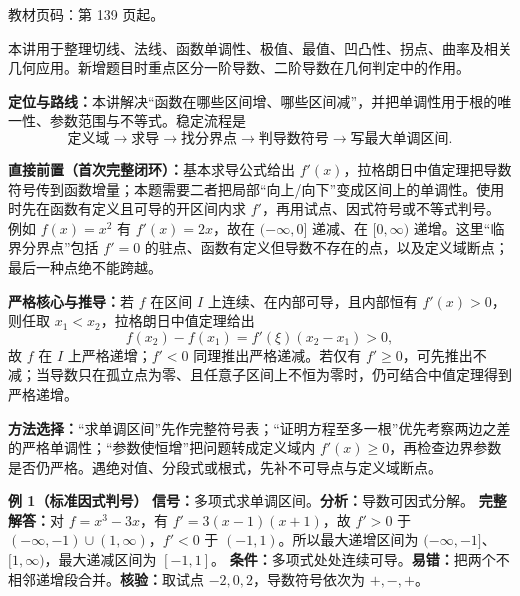
\begin{knowledgeBox}
教材页码：第 139 页起。

本讲用于整理切线、法线、函数单调性、极值、最值、凹凸性、拐点、曲率及相关几何应用。新增题目时重点区分一阶导数、二阶导数在几何判定中的作用。
\end{knowledgeBox}


\par

\begin{knowledgeBox}
\textbf{定位与路线：}本讲解决“函数在哪些区间增、哪些区间减”，并把单调性用于根的唯一性、参数范围与不等式。稳定流程是
\[
\boxed{\text{定义域}\to\text{求导}\to\text{找分界点}\to\text{判导数符号}\to\text{写最大单调区间}}.
\]

\textbf{直接前置（首次完整闭环）：}基本求导公式给出 \(f'(x)\)，拉格朗日中值定理把导数符号传到函数增量；本题需要二者把局部“向上/向下”变成区间上的单调性。使用时先在函数有定义且可导的开区间内求 \(f'\)，再用试点、因式符号或不等式判号。例如 \(f(x)=x^2\) 有 \(f'(x)=2x\)，故在 \((-\infty,0]\) 递减、在 \([0,\infty)\) 递增。这里“临界分界点”包括 \(f'=0\) 的驻点、函数有定义但导数不存在的点，以及定义域断点；最后一种点绝不能跨越。

\textbf{严格核心与推导：}若 \(f\) 在区间 \(I\) 上连续、在内部可导，且内部恒有 \(f'(x)>0\)，则任取 \(x_1<x_2\)，拉格朗日中值定理给出
\[
f(x_2)-f(x_1)=f'(\xi)(x_2-x_1)>0,
\]
故 \(f\) 在 \(I\) 上严格递增；\(f'<0\) 同理推出严格递减。若仅有 \(f'\ge0\)，可先推出不减；当导数只在孤立点为零、且任意子区间上不恒为零时，仍可结合中值定理得到严格递增。

\textbf{方法选择：}“求单调区间”先作完整符号表；“证明方程至多一根”优先考察两边之差的严格单调性；“参数使恒增”把问题转成定义域内 \(f'(x)\ge0\)，再检查边界参数是否仍严格。遇绝对值、分段式或根式，先补不可导点与定义域断点。

\textbf{例 1（标准因式判号）}\quad
\textbf{信号：}多项式求单调区间。\textbf{分析：}导数可因式分解。
\textbf{完整解答：}对 \(f=x^3-3x\)，有 \(f'=3(x-1)(x+1)\)，故 \(f'>0\) 于 \((-\infty,-1)\cup(1,\infty)\)，\(f'<0\) 于 \((-1,1)\)。所以最大递增区间为 \((-\infty,-1]\)、\([1,\infty)\)，最大递减区间为 \([-1,1]\)。
\textbf{条件：}多项式处处连续可导。\textbf{易错：}把两个不相邻递增段合并。\textbf{核验：}取试点 \(-2,0,2\)，导数符号依次为 \(+,-,+\)。


\end{knowledgeBox}
